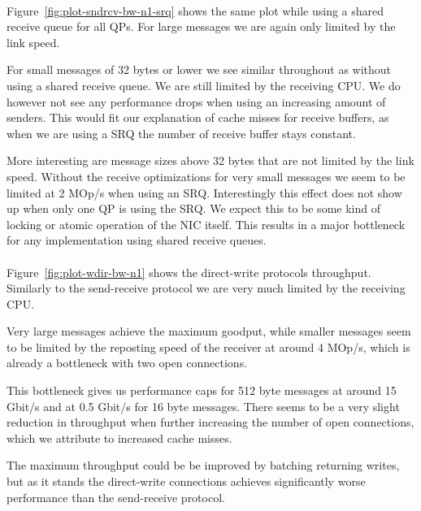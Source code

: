 \paragraph{} Figure~\ref{fig:plot-sndrcv-bw-n1-srq} shows the same plot while using a shared receive queue for all QPs. For
large messages we are again only limited by the link speed.

For small messages of 32 bytes or lower we see similar throughout as without using a shared receive queue. We are still
limited by the receiving CPU. We do however not see any performance drops when using an increasing amount of senders. This
would fit our explanation of cache misses for receive buffers, as when we are using a SRQ the number of receive buffer stays
constant.

More interesting are message sizes above 32 bytes that are not limited by the link speed. Without the receive optimizations 
for very small messages we seem to be limited at 2 MOp/s
when using an SRQ. Interestingly this effect does not show up when only
one QP is using the SRQ. We expect this to be some kind of locking or atomic operation of the NIC itself. This results in a
major bottleneck for any implementation using shared receive queues.

\paragraph{} Figure~\ref{fig:plot-wdir-bw-n1} shows the direct-write protocols throughput. Similarly to the 
send-receive protocol we are very much limited by the receiving CPU.

Very large messages achieve the maximum goodput,  while smaller messages seem to be limited by the reposting speed of the 
receiver at around 4 MOp/s, which is already a bottleneck with two open connections.

This bottleneck gives us performance caps for 512 byte messages at around 15 Gbit/s and at 0.5 Gbit/s for 16 byte messages.
There seems to be a very slight reduction in throughput when further increasing the number of open connections, which we 
attribute to increased cache misses.

The maximum throughput could be be improved by batching returning writes, but as it stands the direct-write connections
achieves significantly worse performance than the send-receive protocol.



